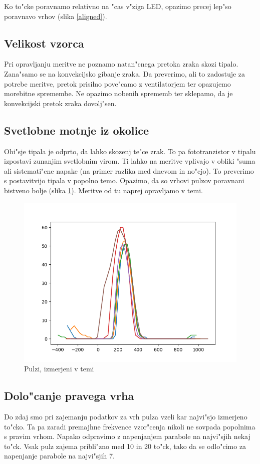 \documentclass[11pt,a4paper]{article}
\begin{document}
Ko to"cke poravnamo relativno na "cas v"ziga LED, opazimo precej lep"so poravnavo vrhov (slika \ref{aligned}).

\subsection{Velikost vzorca}
Pri opravljanju meritve ne poznamo natan"cnega pretoka zraka skozi tipalo. Zana"samo se na konvekcijsko gibanje zraka. Da preverimo, ali to zadostuje za potrebe meritve, pretok prisilno pove"camo z ventilatorjem ter opazujemo morebitne spremembe. Ne opazimo nobenih sprememb ter sklepamo, da je konvekcijski pretok zraka dovolj"sen.

\subsection{Svetlobne motnje iz okolice}
Ohi"sje tipala je odprto, da lahko skozenj te"ce zrak. To pa fototranzistor v tipalu izpostavi zunanjim svetlobnim virom. Ti lahko na meritve vplivajo v obliki "suma ali sistemati"cne napake (na primer razlika med dnevom in no"cjo). To preverimo s postavitvijo tipala v popolno temo. Opazimo, da so vrhovi pulzov poravnani bistveno bolje (slika \ref{dark}). Meritve od tu naprej opravljamo v temi.

\begin{figure}[H]
	\begin{center}
		\includegraphics[width=12cm]{dark.png}
		\caption{Pulzi, izmerjeni v temi}
		\label{dark}
	\end{center}
\end{figure}

\subsection{Dolo"canje pravega vrha}
Do zdaj smo pri zajemanju podatkov za vrh pulza vzeli kar najvi"sjo izmerjeno to"cko. Ta pa zaradi premajhne frekvence vzor"cenja nikoli ne sovpada popolnima s pravim vrhom. Napako odpravimo z napenjanjem parabole na najvi"sjih nekaj to"ck. Vsak pulz zajema pribli"zno med 10 in 20 to"ck, tako da se odlo"cimo za napenjanje parabole na najvi"sjih 7.
\end{document}
